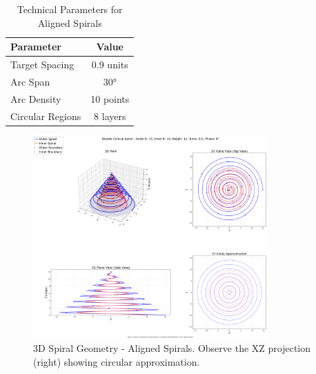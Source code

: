 \documentclass{article}%
\begin{document}
\begin{table}[h!]%
\caption{Technical Parameters for Aligned Spirals}%
\begin{center}%
\begin{tabular}{@{}|l|c|@{}}%
\toprule%
\midrule%
\textbf{Parameter}&\textbf{Value}\\%
\midrule%
Target Spacing&0.9 units\\%
Arc Span&30°\\%
Arc Density&10 points\\%
Circular Regions&8 layers\\%
\midrule\bottomrule%
%
\end{tabular}%
\end{center}%
\end{table}

%


\begin{figure}[h!]%
\centering%
\includegraphics[width=0.8\textwidth]{3d_plot_Aligned_Spirals.png}%
\caption{3D Spiral Geometry {-} Aligned Spirals. Observe the XZ projection (right) showing circular approximation.}%
\end{figure}

%
\vspace{1cm}

%
\newpage%
\end{document}
